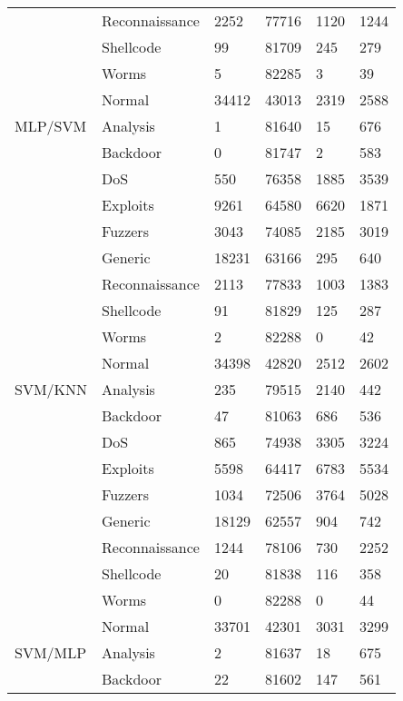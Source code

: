 \begin{longtable}{@{}llllll@{}}
        & Reconnaissance & 2252  & 77716 & 1120  & 1244  \\
        & Shellcode      & 99    & 81709 & 245   & 279   \\
        & Worms          & 5     & 82285 & 3     & 39    \\
        & Normal         & 34412 & 43013 & 2319  & 2588  \\
MLP/SVM & Analysis       & 1     & 81640 & 15    & 676   \\
        & Backdoor       & 0     & 81747 & 2     & 583   \\
        & DoS            & 550   & 76358 & 1885  & 3539  \\
        & Exploits       & 9261  & 64580 & 6620  & 1871  \\
        & Fuzzers        & 3043  & 74085 & 2185  & 3019  \\
        & Generic        & 18231 & 63166 & 295   & 640   \\
        & Reconnaissance & 2113  & 77833 & 1003  & 1383  \\
        & Shellcode      & 91    & 81829 & 125   & 287   \\
        & Worms          & 2     & 82288 & 0     & 42    \\
        & Normal         & 34398 & 42820 & 2512  & 2602  \\
SVM/KNN & Analysis       & 235   & 79515 & 2140  & 442   \\
        & Backdoor       & 47    & 81063 & 686   & 536   \\
        & DoS            & 865   & 74938 & 3305  & 3224  \\
        & Exploits       & 5598  & 64417 & 6783  & 5534  \\
        & Fuzzers        & 1034  & 72506 & 3764  & 5028  \\
        & Generic        & 18129 & 62557 & 904   & 742   \\
        & Reconnaissance & 1244  & 78106 & 730   & 2252  \\
        & Shellcode      & 20    & 81838 & 116   & 358   \\
        & Worms          & 0     & 82288 & 0     & 44    \\
        & Normal         & 33701 & 42301 & 3031  & 3299  \\
SVM/MLP & Analysis       & 2     & 81637 & 18    & 675   \\
        & Backdoor       & 22    & 81602 & 147   & 561   \\

\end{longtable}

